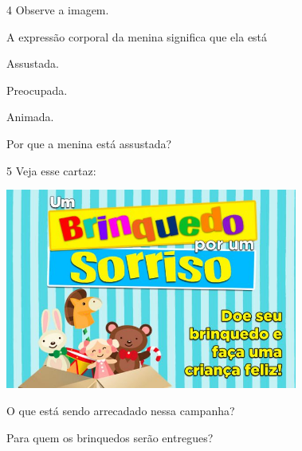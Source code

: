\num{4} Observe a imagem.


\begin{escolha}
\item A expressão corporal da menina significa que ela está

\begin{boxlist}
\boxitem[] Assustada.

\boxitem[] Preocupada.

\boxitem[] Animada.
\end{boxlist}

\item Por que a menina está assustada?


\end{escolha}

\num{5} Veja esse cartaz:

\includegraphics[width=3.78169in,height=2.59560in]{media/image132.jpeg}


\begin{escolha}
\item O que está sendo arrecadado nessa campanha?


\item Para quem os brinquedos serão entregues?

\end{escolha}


